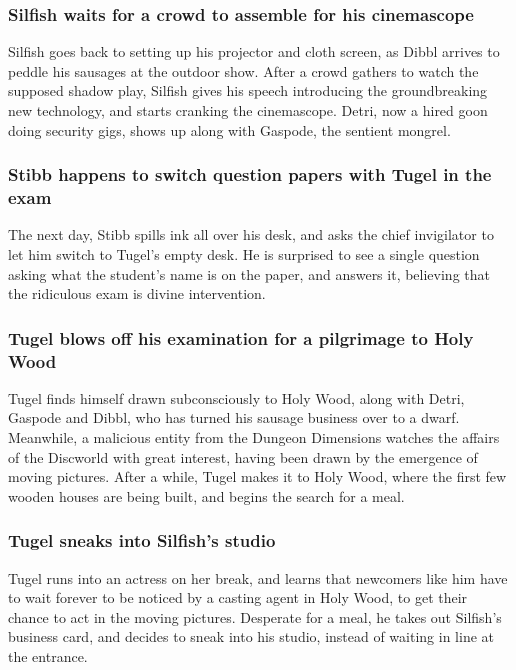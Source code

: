 \subsubsection{\Gls{Silfish} waits for a crowd to assemble for his cinemascope}
\Gls{Silfish} goes back to setting up his projector and cloth screen, as \Gls{Dibbl} arrives to
peddle his sausages at the outdoor show. After a crowd gathers to watch the supposed shadow play,
\Gls{Silfish} gives his speech introducing the groundbreaking new technology, and starts cranking
the cinemascope. \Gls{Detri}, now a hired goon doing security gigs, shows up along with
\Gls{Gaspode}, the sentient mongrel.

\subsubsection{\Gls{Stibb} happens to switch question papers with \Gls{Tugel} in the exam}
The next day, \Gls{Stibb} spills ink all over his desk, and asks the chief invigilator to let him
switch to \Gls{Tugel}'s empty desk. He is surprised to see a single question asking what the
student's name is on the paper, and answers it, believing that the ridiculous exam is divine
intervention.

\subsubsection{\Gls{Tugel} blows off his examination for a pilgrimage to Holy Wood}
\Gls{Tugel} finds himself drawn subconsciously to Holy Wood, along with \Gls{Detri}, \Gls{Gaspode}
and \Gls{Dibbl}, who has turned his sausage business over to a dwarf. Meanwhile, a malicious
entity from the Dungeon Dimensions watches the affairs of the Discworld with great interest, having
been drawn by the emergence of moving pictures. After a while, \Gls{Tugel} makes it to Holy Wood,
where the first few wooden houses are being built, and begins the search for a meal.

\subsubsection{\Gls{Tugel} sneaks into \Gls{Silfish}'s studio}
\Gls{Tugel} runs into an actress on her break, and learns that newcomers like him have to wait
forever to be noticed by a casting agent in Holy Wood, to get their chance to act in the moving
pictures. Desperate for a meal, he takes out \Gls{Silfish}'s business card, and decides to sneak
into his studio, instead of waiting in line at the entrance.

